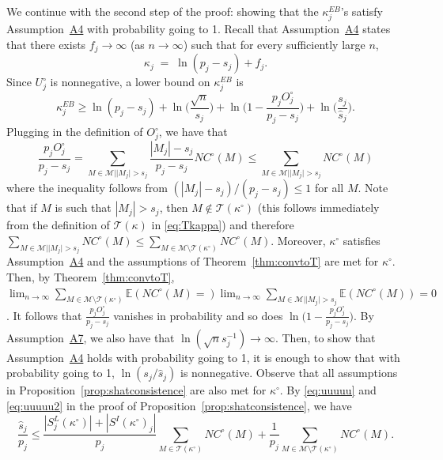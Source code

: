 \documentclass[
  12pt]{article}
\newcommand{\E}{\mathbb{E}}
\newcommand{\M}{\mathcal{M}}
\newcommand{\T}{\mathcal{T}}
\begin{document}
We continue with the second step of the proof: showing that the $\kappa^{EB}_j$'s satisfy Assumption~\hyperlink{lab:A4}{A4} with probability going to 1. Recall that Assumption~\hyperlink{lab:A4}{A4} states that there exists $f_j\to \infty$ (as $n\to \infty$) such that for every sufficiently large $n$,
\begin{equation*}
    \kappa_j \;=\;\ln(p_j-s_j) + f_j.
\end{equation*}
Since $U_j^{\circ}$ is nonnegative, a lower bound on $\kappa^{EB}_j$ is %
\begin{equation}\label{eq:decompstep2pen2}
    \kappa^{EB}_j
    \geq  \ln(p_j-s_j)+\ln\Big(\frac{\sqrt{n}}{s_j}\Big)+\ln\Big(1-\frac{p_j O^{\circ}_j}{p_j-s_j}\Big)+\ln\Big(\frac{s_j}{\hat{s}_j}\Big).
\end{equation}
Plugging in the definition of $O^{\circ}_j$, we have that
$$\frac{p_j O^{\circ}_j}{p_j-s_j} =  \sum_{M \in \M | |M_j| > s_j}\frac{|M_j|-s_j}{p_j-s_j}NC^{\circ}(M)\leq \sum_{M \in \M | |M_j| > s_j}NC^{\circ}(M)$$
where the inequality follows from $(|M_j|-s_j)/(p_j-s_j)\leq 1$ for all $M$.
Note that if $M$ is such that $|M_j|>s_j$, then $M\not\in\T(\kappa^{\circ})$ (this follows immediately from the definition of $\T(\kappa)$ in \eqref{eq:Tkappa})  and therefore $\sum_{M \in \M | |M_j| > s_j}NC^{\circ}(M)\leq \sum_{M \in \M \setminus \T(\kappa^{\circ})}NC^{\circ}(M)$. Moreover, $\kappa^{\circ}$ satisfies Assumption~\hyperlink{lab:A4}{A4} and the assumptions of Theorem~\ref{thm:convtoT} are met for $\kappa^{\circ}$.
Then, by Theorem~\ref{thm:convtoT}, $\lim_{n\to\infty} \sum_{M \in \M \setminus \T(\kappa^{\circ})}\E(NC^{\circ}(M)=)\lim_{n\to\infty}\sum_{M \in \M | |M_j| > s_j}\E(NC^{\circ}(M)) = 0$. It follows that $\frac{p_j O^{\circ}_j}{p_j-s_j}$ vanishes in probability and so does $\ln\Big(1-\frac{p_j O^{\circ}_j}{p_j-s_j}\Big)$. By Assumption~\hyperlink{lab:A7}{A7}, we also have that $\ln(\sqrt{n}s_j^{-1})\to\infty$. 
Then, to show that Assumption~\hyperlink{lab:A4}{A4} holds with probability going to 1, it is enough to show that with probability going to 1, $\ln(s_j/\hat{s}_j)$ is nonnegative. Observe that all assumptions in Proposition~\ref{prop:shatconsistence} are also met for $\kappa^{\circ}$. By \eqref{eq:uuuuu} and \eqref{eq:uuuuu2} in the proof of Proposition~\ref{prop:shatconsistence}, we have
\begin{equation*}
    \frac{\hat{s}_j}{p_j}\leq \frac{|S^{L}_j(\kappa^{\circ})|+|S^{I}(\kappa^{\circ})_j|}{p_j}\sum_{M \in \T(\kappa^{\circ})}NC^{\circ}(M) + \frac{1}{p_j} \sum_{M \in \M\setminus \T(\kappa^{\circ})}NC^{\circ}(M).
\end{equation*}
\end{document}
